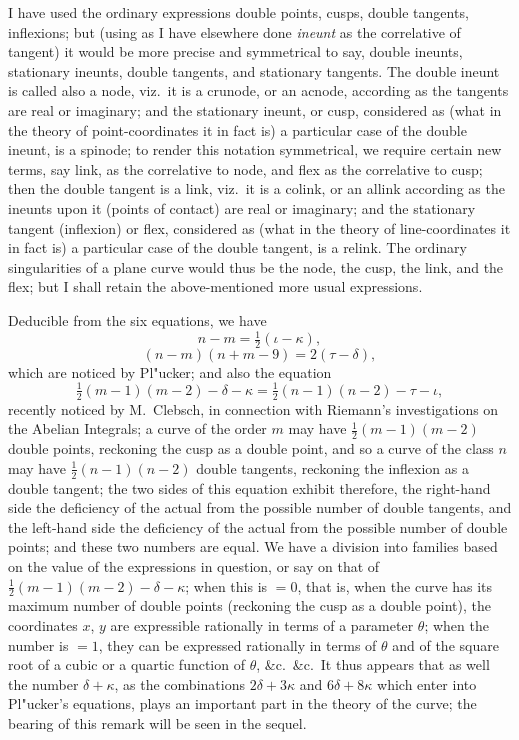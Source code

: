 \documentclass[11pt,a4paper]{article}
\begin{document}
\noindent
I have used the ordinary expressions double points, cusps, double tangents, inflexions; but (using as I have elsewhere done \textit{ineunt} as the correlative of tangent) it would be more precise and symmetrical to say, double ineunts, stationary ineunts, double tangents, and stationary tangents. The double ineunt is called also a node, viz.~it is a crunode, or an acnode, according as the tangents are real or imaginary; and the stationary ineunt, or cusp, considered as (what in the theory of point-coordinates it in fact is) a particular case of the double ineunt, is a spinode; to render this notation symmetrical, we require certain new terms, say link, as the correlative to node, and flex as the correlative to cusp; then the double tangent is a link, viz.~it is a colink, or an allink according as the ineunts upon it (points of contact) are real or imaginary; and the stationary tangent (inflexion) or flex, considered as (what in the theory of line-coordinates it in fact is) a particular case of the double tangent, is a relink. The ordinary singularities of a plane curve would thus be the node, the cusp, the link, and the flex; but I shall retain the above-mentioned more usual expressions.

Deducible from the six equations, we have
\[
n - m = \tfrac{1}{2}(\iota - \kappa),
\]
\[
(n - m)(n + m - 9) = 2(\tau - \delta),
\]
which are noticed by Pl"{u}cker; and also the equation
\[
\tfrac{1}{2}(m - 1)(m - 2) - \delta - \kappa = \tfrac{1}{2}(n - 1)(n - 2) - \tau - \iota,
\]
recently noticed by M.~Clebsch, in connection with Riemann's investigations on the Abelian Integrals; a curve of the order $m$ may have $\tfrac{1}{2}(m - 1)(m - 2)$ double points, reckoning the cusp as a double point, and so a curve of the class $n$ may have $\tfrac{1}{2}(n - 1)(n - 2)$ double tangents, reckoning the inflexion as a double tangent; the two sides of this equation exhibit therefore, the right-hand side the deficiency of the actual from the possible number of double tangents, and the left-hand side the deficiency of the actual from the possible number of double points; and these two numbers are equal. We have a division into families based on the value of the expressions in question, or say on that of $\tfrac{1}{2}(m - 1)(m - 2) - \delta - \kappa$; when this is $= 0$, that is, when the curve has its maximum number of double points (reckoning the cusp as a double point), the coordinates $x$, $y$ are expressible rationally in terms of a parameter $\theta$; when the number is $= 1$, they can be expressed rationally in terms of $\theta$ and of the square root of a cubic or a quartic function of $\theta$, \&c.\ \&c.\ It thus appears that as well the number $\delta + \kappa$, as the combinations $2\delta + 3\kappa$ and $6\delta + 8\kappa$ which enter into Pl"{u}cker's equations, plays an important part in the theory of the curve; the bearing of this remark will be seen in the sequel.
\end{document}
